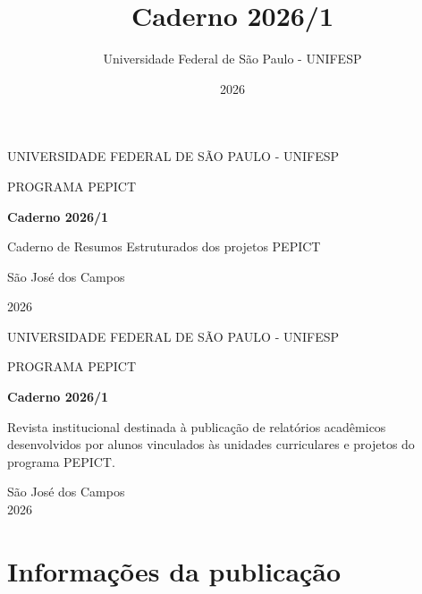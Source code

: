 \documentclass[12pt,openright,oneside,a4paper]{report}
\title{Caderno 2026/1}
\author{Universidade Federal de São Paulo - UNIFESP}
\date{2026}
\begin{document}
\begin{titlepage}
    \centering
    \vspace*{2cm}
    {\Large UNIVERSIDADE FEDERAL DE SÃO PAULO - UNIFESP \par}
    \vspace{0.5cm}
    {\large PROGRAMA PEPICT \par}
    \vfill
    {\bfseries\LARGE Caderno 2026/1 \par}
    \vspace{1cm}
    {\large Caderno de Resumos Estruturados dos projetos PEPICT\par}
    \vfill
    {\large São José dos Campos\par}
    {\large 2026 \par}
\end{titlepage}

\begin{titlepage}
    \centering
    {\Large UNIVERSIDADE FEDERAL DE SÃO PAULO - UNIFESP \par}
    \vspace{0.5cm}
    {\large PROGRAMA PEPICT \par}
    \vspace{4cm}
    {\bfseries\LARGE Caderno 2026/1 \par}
    \vspace{2cm}
    \hspace{.45\textwidth}
    \begin{minipage}{.5\textwidth}
        \onehalfspacing
        Revista institucional destinada à publicação de relatórios acadêmicos desenvolvidos por alunos vinculados às unidades curriculares e projetos do programa PEPICT.
    \end{minipage}
    \vfill
    \begin{center}
        São José dos Campos \\
        2026
    \end{center}
\end{titlepage}

\chapter*{Informações da publicação}
\thispagestyle{empty}
\end{document}
